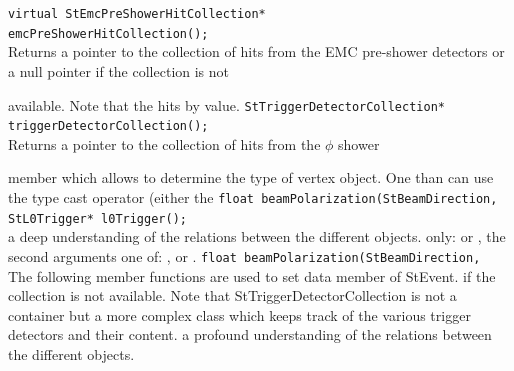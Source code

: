     \verb+virtual StEmcPreShowerHitCollection*+\\
    \verb+emcPreShowerHitCollection();+\\
    Returns a pointer to the collection of hits from the EMC
    pre-shower detectors or a null pointer if the collection is not
    
    available.  Note that  the
     
    hits by value.
    \verb+StTriggerDetectorCollection* triggerDetectorCollection();+\\
    Returns a pointer to the collection of hits from the $\phi$ shower
   
    member  which allows to determine the type of vertex
    object. One than can use the type cast operator (either the
    \verb+float beamPolarization(StBeamDirection,+\\
    \verb+StL0Trigger* l0Trigger();+\\
    
    a deep understanding of the relations between the different objects.    
    only:  or ,  the second arguments one of:
    ,  or .
    \verb+float beamPolarization(StBeamDirection,+\\ 
    The following member functions are used to set data member of StEvent.
    if the collection is not available. Note that StTriggerDetectorCollection
    is not a container but a more complex class which keeps track of the
    various trigger detectors and their content.
    a profound understanding of the relations between the different objects.    
    
